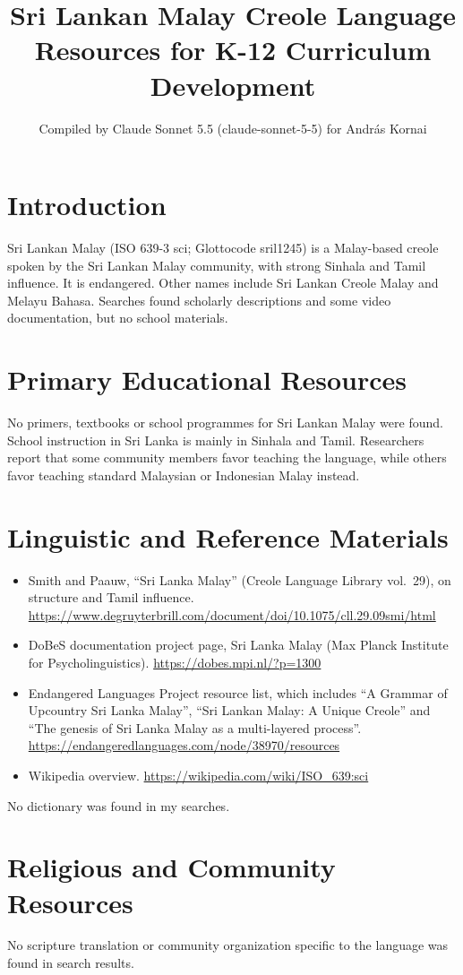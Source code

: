\documentclass[12pt]{article}
\title{Sri Lankan Malay Creole Language Resources for K-12 Curriculum Development}
\author{Compiled by Claude Sonnet 5.5 (claude-sonnet-5-5) for Andr\'as Kornai}
\date{}
\begin{document}
\maketitle

\section{Introduction}
Sri Lankan Malay (ISO 639-3 sci; Glottocode sril1245) is a Malay-based creole spoken by the Sri Lankan Malay community, with strong Sinhala and Tamil influence. It is endangered. Other names include Sri Lankan Creole Malay and Melayu Bahasa. Searches found scholarly descriptions and some video documentation, but no school materials.

\section{Primary Educational Resources}
No primers, textbooks or school programmes for Sri Lankan Malay were found. School instruction in Sri Lanka is mainly in Sinhala and Tamil. Researchers report that some community members favor teaching the language, while others favor teaching standard Malaysian or Indonesian Malay instead.

\section{Linguistic and Reference Materials}
\begin{itemize}
\item Smith and Paauw, ``Sri Lanka Malay'' (Creole Language Library vol.\ 29), on structure and Tamil influence. \url{https://www.degruyterbrill.com/document/doi/10.1075/cll.29.09smi/html}
\item DoBeS documentation project page, Sri Lanka Malay (Max Planck Institute for Psycholinguistics). \url{https://dobes.mpi.nl/?p=1300}
\item Endangered Languages Project resource list, which includes ``A Grammar of Upcountry Sri Lanka Malay'', ``Sri Lankan Malay: A Unique Creole'' and ``The genesis of Sri Lanka Malay as a multi-layered process''. \url{https://endangeredlanguages.com/node/38970/resources}
\item Wikipedia overview. \url{https://wikipedia.com/wiki/ISO_639:sci}
\end{itemize}
No dictionary was found in my searches.

\section{Religious and Community Resources}
No scripture translation or community organization specific to the language was found in search results.
\end{document}
